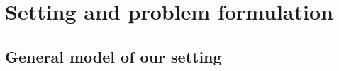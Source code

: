 \documentclass[letterpaper]{article} %
\theoremstyle{definition}%
\theoremstyle{definition}
\newcommand{\pa}{\text{Pa}}
\newcommand{\defi}{\emph}
\begin{document}
%






\section{Setting and problem formulation}

\subsection{General model of our setting}
\label{sec:model}
\end{document}
